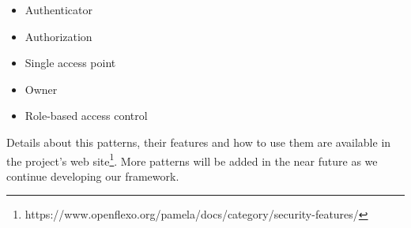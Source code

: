 \begin{itemize}
    \item Authenticator
    \item Authorization
    \item Single access point
    \item Owner
    \item Role-based access control
\end{itemize}

Details about this patterns, their features and how to use them are available in the project's web site\footnote{https://www.openflexo.org/pamela/docs/category/security-features/}. More patterns will be added in the near future as we continue developing our framework.

